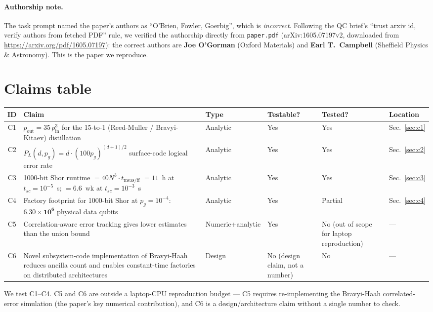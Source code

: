 \documentclass[11pt]{article}
\begin{document}
\paragraph{Authorship note.} The task prompt named the paper's
authors as ``O'Brien, Fowler, Goerbig'', which is \emph{incorrect}.
Following the QC brief's ``trust arxiv id, verify authors from fetched
PDF'' rule, we verified the authorship directly from
\texttt{paper.pdf} (arXiv:1605.07197v2, downloaded from
\url{https://arxiv.org/pdf/1605.07197}): the correct authors are
\textbf{Joe O'Gorman} (Oxford Materials) and \textbf{Earl T.\ Campbell}
(Sheffield Physics \& Astronomy). This is the paper we reproduce.

\section{Claims table}

\begin{tabular}{clllll}
\toprule
ID & Claim & Type & Testable? & Tested? & Location \\
\midrule
C1 & $p_{\text{out}}=35\,p_{\text{in}}^{3}$ for the 15-to-1
     (Reed-Muller / Bravyi-Kitaev) distillation & Analytic & Yes & Yes & Sec.~\ref{sec:c1} \\
C2 & $P_L(d,p_g)=d\cdot(100 p_g)^{(d+1)/2}$ surface-code logical error rate & Analytic & Yes & Yes & Sec.~\ref{sec:c2} \\
C3 & 1000-bit Shor runtime $= 40 N^{3} \cdot t_{\text{meas/ff}}$
     $= 11$~h at $t_{sc}=10^{-5}$~s;  $= 6.6$~wk at $t_{sc}=10^{-3}$~s & Analytic & Yes & Yes & Sec.~\ref{sec:c3} \\
C4 & Factory footprint for 1000-bit Shor at $p_g=10^{-4}$:
     $\mathbf{6.30\times 10^{6}}$ physical data qubits & Analytic & Yes & Partial & Sec.~\ref{sec:c4} \\
C5 & Correlation-aware error tracking gives lower estimates than
     the union bound & Numeric+analytic & Yes & No (out of scope for
     laptop reproduction) & --- \\
C6 & Novel subsystem-code implementation of Bravyi-Haah reduces
     ancilla count and enables constant-time factories on
     distributed architectures & Design & No (design claim,
     not a number) & No & --- \\
\bottomrule
\end{tabular}

\bigskip

We test C1--C4. C5 and C6 are outside a
laptop-CPU reproduction budget --- C5 requires re-implementing the
Bravyi-Haah correlated-error simulation (the paper's key numerical
contribution), and C6 is a design/architecture claim without a single
number to check.
\end{document}
